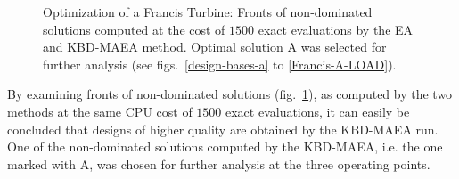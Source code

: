 \begin{figure}[h!]
\begin{minipage}[b]{1\linewidth}
 \centering
\end{minipage}
\caption{Optimization of a Francis Turbine: Fronts of non-dominated solutions computed at the cost of $1500$ exact evaluations by the EA and KBD-MAEA method. Optimal solution A was selected for further analysis (see figs.\ \ref{design-bases-a} to \ref{Francis-A-LOAD}).}
\label{Francis-Res-par}
\end{figure}

By examining fronts of non-dominated solutions (fig.\ \ref{Francis-Res-par}), as computed by the two methods at the same CPU cost of $1500$ exact evaluations, it can easily be concluded that designs of higher quality are obtained by the KBD-MAEA run. 
One of the non-dominated solutions computed by the KBD-MAEA, i.e. the one marked with A, was chosen for further analysis at the three operating points.



